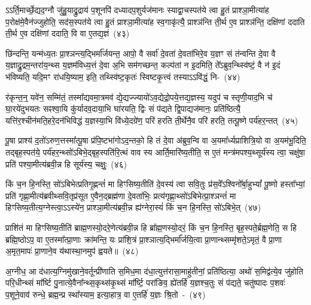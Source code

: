 ऽऽर्ति॒मार्च्छे॒द्यद॒ग्नौ जु॑हु॒याद्रु॒द्राय॑ प॒शूनपि॑ दध्यादप॒शुर्यज॑मानः स्याद्वा॒चस्पत॑ये त्वा हु॒तं प्राश्ञा॒मीत्या॑ह प॒रोक्ष॑मे॒वैन॑ज्जुहोति॒ सद॑स॒स्पत॑ये त्वा हु॒तं प्राश्ञा॒मीत्या॑ह स्व॒गाकृ॑त्यै॒ प्राश्ञ॑न्ति ती॒र्थ ए॒व प्राश्ञ॑न्ति॒ दक्षि॑णां ददाति ती॒र्थ ए॒व दक्षि॑णां ददाति॒ वि वा ए॒तद्य॒ज्ञं~(४३)\ip

छि॑न्दन्ति॒ यन्म॑ध्य॒तः प्रा॒श्ञन्त्य॒द्भिर्मा᳚र्जयन्त॒ आपो॒ वै सर्वा॑ दे॒वता॑ दे॒वता॑भिरे॒व य॒ज्ञꣳ सं त॑न्वन्ति दे॒वा वै य॒ज्ञाद्रु॒द्रम॒न्तरा॑य॒न्थ्स य॒ज्ञम॑विध्य॒त्तं दे॒वा अ॒भि सम॑गच्छन्त॒ कल्प॑तां न इ॒दमिति॒ ते᳚\-ऽब्रुव॒न्थ्स्वि॑ष्टं॒ वै न॑ इ॒दं भ॑विष्यति॒ यदि॒मꣳ रा॑धयि॒ष्याम॒ इति॒ तथ्स्वि॑ष्ट॒कृतः॑ स्विष्टकृ॒त्त्वं तस्या\-ऽऽ\-वि॑द्धं॒ नि-~(४४)\ip

र॑कृन्त॒न्॒ यवे॑न॒ सम्मि॑तं॒ तस्मा᳚द्\-यवमा॒त्रमव॑ द्ये॒द्यज्ज्यायो॑\-ऽव॒द्येद्रो॒पये॒त्तद्य॒ज्ञस्य॒ यदुप॑ च स्तृणी॒याद॒भि च॑ घा॒रये॑दुभयतः सꣴश्वा॒यि कु॑र्यादव॒दाया॒भि घा॑रयति॒ द्विः सं प॑द्यते द्वि॒पाद्यज॑मानः॒ प्रति॑ष्ठित्यै॒ यत्ति॑र॒श्चीन॑मति॒हरे॒दन॑भिविद्धं य॒ज्ञस्या॒भि वि॑ध्ये॒दग्रे॑ण॒ परि॑ हरति ती॒र्थेनै॒व परि॑ हरति॒ तत्पू॒ष्णे पर्य॑हर॒न्तत्~(४५)\ip

पू॒षा प्राश्य॑ द॒तो॑\-ऽरुण॒त्तस्मा᳚त्पू॒षा प्र॑पि॒ष्टभा॑गो\-ऽद॒न्तको॒ हि तं दे॒वा अ॑ब्रुव॒न्वि वा अ॒यमा᳚र्ध्यप्राशित्रि॒यो वा अ॒यम॑भू॒दिति॒ तद्बृह॒स्पत॑ये॒ पर्य॑हर॒न्थ्सो॑\-ऽबिभे॒द्बृह॒स्पति॑रि॒त्थं वाव स्य आर्ति॒\-मारि॑\-ष्य॒\-तीति॒ स ए॒तं मन्त्र॑मपश्य॒थ्सूर्य॑स्य त्वा॒ चक्षु॑षा॒ प्रति॑ पश्या॒मीत्य॑ब्रवी॒न्न हि सूर्य॑स्य॒ चक्षुः॒~(४६)\ip

किं च॒न हि॒नस्ति॒ सो॑\-ऽबिभेत्प्रतिगृ॒ह्णन्तं॑ मा हिꣳसिष्य॒तीति॑ दे॒वस्य॑ त्वा सवि॒तुः प्र॑स॒वे᳚\-ऽश्विनो᳚र्बा॒हु\-भ्यां᳚ पू॒ष्णो हस्ता᳚भ्यां॒ प्रति॑ गृह्णा॒मीत्य॑ब्रवीथ्सवि॒तृप्र॑सूत ए॒वैन॒द्ब्रह्म॑णा दे॒वता॑भिः॒ प्रत्य॑\-गृह्णा॒थ्सो॑\-ऽबिभेत्प्रा॒श्ञन्तं॑ मा हिꣳसिष्य॒तीत्य॒ग्नेस्त्वा॒\-ऽऽ\-\-स्ये॑न॒ प्राश्ञा॒मीत्य॑ब्रवी॒न्न ह्य॑ग्नेरा॒स्यं॑ किं च॒न हि॒नस्ति॒ सो॑\-ऽबिभे॒त्~(४७)\ip

प्राशि॑तं मा हिꣳसिष्य॒तीति॑ ब्राह्म॒णस्यो॒दरे॒णेत्य॑ब्रवी॒न्न हि ब्रा᳚ह्म॒णस्यो॒दरं॒ किं च॒न हि॒नस्ति॒ बृह॒स्पते॒र्ब्रह्म॒णेति॒ स हि ब्रह्मि॒ष्ठो\-ऽप॒ वा ए॒तस्मा᳚त्प्रा॒णाः क्रा॑मन्ति॒ यः प्रा॑शि॒त्रं प्रा॒श्ञात्य॒द्भिर्मा᳚र्जयि॒त्वा प्रा॒णान्थ्सम्मृ॑शते॒\-ऽमृतं॒ वै प्रा॒णा अ॒मृत॒मापः॑ प्रा॒णाने॒व य॑थास्था॒नमुप॑ ह्वयते॥~(४८)\ip

{\anuvakamend[{प्रा॒श्ञी॒याद्धोता॑ य॒ज्ञं निर॑हर॒न्तच्चक्षु॑रा॒स्य॑ङ्किं च॒न हि॒नस्ति॒ सो॑\-ऽबिभे॒च्चतु॑श्चत्वारिꣳशच्च}]}

अ॒ग्नीध॒ आ द॑धात्य॒ग्निमु॑खाने॒वर्तून्प्री॑णाति स॒मिध॒मा द॑धा॒त्युत्त॑रासा॒माहु॑तीनां॒ प्रति॑ष्ठित्या॒ अथो॑ स॒मिद्व॑त्ये॒व जु॑होति परि॒धीन्थ्सं मा᳚र्ष्टि पु॒नात्ये॒वैना᳚न्थ्स॒कृथ्स॑कृ॒थ्सं मा᳚र्ष्टि॒ परा॑ङिव॒ ह्ये॑तर्\mbox{}हि॑ य॒ज्ञश्च॒तुः सं प॑द्यते॒ चतु॑ष्पादः प॒शवः॑ प॒शूने॒वाव॑ रुन्धे॒ ब्रह्म॒न्प्र स्था᳚स्याम॒ इत्या॒हात्र॒ वा ए॒तर्\mbox{}हि॑ य॒ज्ञः श्रि॒तो~-~(४९)\ip

